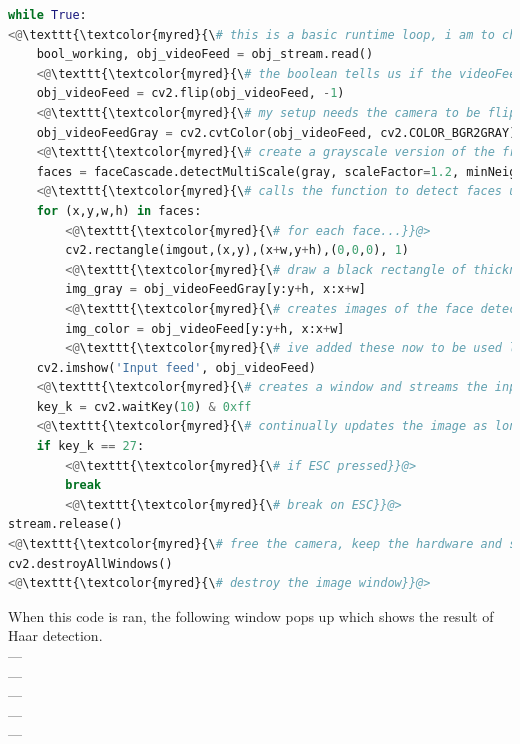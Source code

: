 \documentclass[9pt]{article}
\begin{document}
\begin{lstlisting}[language=Python]
while True:
<@\texttt{\textcolor{myred}{\# this is a basic runtime loop, i am to change this when i add the web interface to call this as a function}}@> 
	bool_working, obj_videoFeed = obj_stream.read() 
	<@\texttt{\textcolor{myred}{\# the boolean tells us if the videoFeed could be read correctly, and the other variable contains images from the camera}}@> 
	obj_videoFeed = cv2.flip(obj_videoFeed, -1)
	<@\texttt{\textcolor{myred}{\# my setup needs the camera to be flipped due to its placement}}@> 
	obj_videoFeedGray = cv2.cvtColor(obj_videoFeed, cv2.COLOR_BGR2GRAY)
	<@\texttt{\textcolor{myred}{\# create a grayscale version of the frames captured using the OpenCV conversion}}@> 
	faces = faceCascade.detectMultiScale(gray, scaleFactor=1.2, minNeighbors=5, minSize=(30, 30))
	<@\texttt{\textcolor{myred}{\# calls the function to detect faces using the Haar Cascade, applied to the gray image}}@> 
	for (x,y,w,h) in faces:
		<@\texttt{\textcolor{myred}{\# for each face...}}@> 
		cv2.rectangle(imgout,(x,y),(x+w,y+h),(0,0,0), 1) 
		<@\texttt{\textcolor{myred}{\# draw a black rectangle of thickness 1 as a bounding box around the face}}@>
		img_gray = obj_videoFeedGray[y:y+h, x:x+w]
		<@\texttt{\textcolor{myred}{\# creates images of the face detected in greyscale and in color}}@> 
		img_color = obj_videoFeed[y:y+h, x:x+w]
		<@\texttt{\textcolor{myred}{\# ive added these now to be used later when saving photos of unknown people, just for testing at the moment}}@> 
	cv2.imshow('Input feed', obj_videoFeed) 
	<@\texttt{\textcolor{myred}{\# creates a window and streams the input from the camera from the variable imgout}}@>
	key_k = cv2.waitKey(10) & 0xff
	<@\texttt{\textcolor{myred}{\# continually updates the image as long as ESC isnt pressed}}@> 
	if key_k == 27:
		<@\texttt{\textcolor{myred}{\# if ESC pressed}}@>
		break
		<@\texttt{\textcolor{myred}{\# break on ESC}}@> 
stream.release()
<@\texttt{\textcolor{myred}{\# free the camera, keep the hardware and software (mainly memory) tidy, this prevents errors with the camera being in-use whilst we try to run the code}}@> 
cv2.destroyAllWindows()
<@\texttt{\textcolor{myred}{\# destroy the image window}}@> 

\end{lstlisting}
When this code is ran, the following window pops up which shows the result of Haar detection.
\\
---\\
---\\
---\\
---\\
---\\
\end{document}
